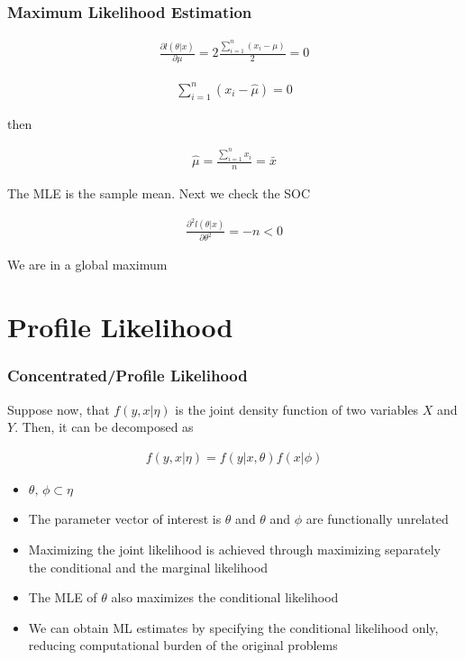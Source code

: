 \documentclass[
  shownotes,
  xcolor={svgnames},
  hyperref={colorlinks,citecolor=DarkBlue,linkcolor=DarkRed,urlcolor=DarkBlue}
  , aspectratio=169]{beamer}
\begin{document}
\begin{frame}[fragile]
\frametitle{Maximum Likelihood Estimation}

\begin{align}
\frac{\partial l\left(\theta |x\right)}{\partial\mu}=2\frac{\sum_{i=1}^{n}\left(x_{i}-\mu\right)}{2}=0
\end{align}


\begin{align}
\sum_{i=1}^{n}\left(x_{i}-\hat{\mu}\right)=0
\end{align}

then

\begin{align}
\hat{\mu}=\frac{\sum_{i=1}^{n}x_{i}}{n}=\bar{x}
\end{align}

The MLE is the sample mean. Next we check the SOC


\begin{align}
\frac{\partial^2l(\theta|x)}{\partial \theta^2}=-n<0
\end{align}

We are in  a global maximum

\end{frame}
\section{Profile Likelihood }
\begin{frame}[fragile]
\frametitle{Concentrated/Profile Likelihood }

Suppose now, that $f(y,x|\eta)$ is the joint density function of two variables $X$ and $Y$.  Then, it can be decomposed as

\begin{align}
f(y,x|\eta) =f(y|x,\theta)f(x|\phi)
\end{align}

\begin{itemize}
  \item $\theta,\,\phi \subset \eta$ 
  \medskip
  \item The parameter vector of interest is  $\theta$ and $\theta$ and $\phi$ are functionally unrelated
  \medskip
  \item Maximizing the joint likelihood is achieved through maximizing separately the conditional and the marginal likelihood
  \medskip
  \item The MLE of $\theta$ also maximizes the conditional likelihood  
  \medskip
  \item We can obtain ML estimates by specifying the conditional likelihood only, reducing computational burden of the original problems
\end{itemize}  
\end{frame}
\end{document}
